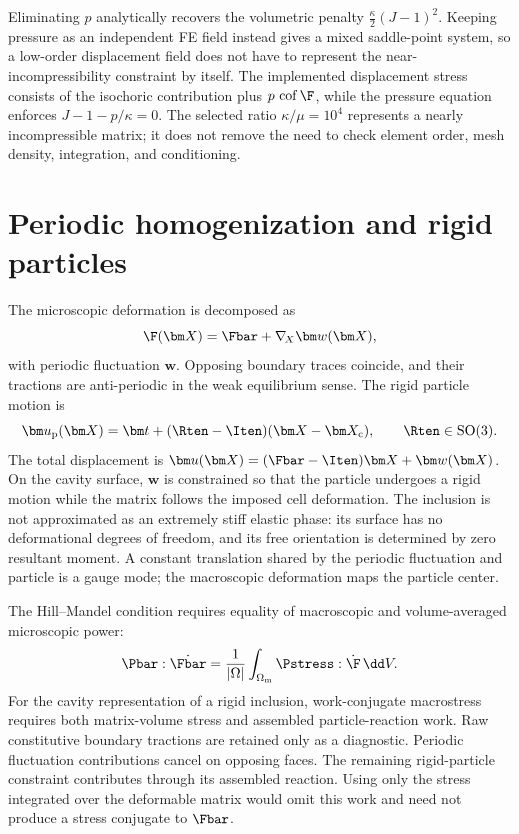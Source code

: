 Eliminating \(p\) analytically recovers the volumetric penalty
\(\frac{\kappa}{2}(J-1)^2\). Keeping pressure as an independent FE field
instead gives a mixed saddle-point system, so a low-order displacement field
does not have to represent the near-incompressibility constraint by itself.
The implemented displacement stress consists of the isochoric contribution
plus \(p\,\operatorname{cof}\F\), while the pressure equation enforces
\(J-1-p/\kappa=0\). The selected ratio \(\kappa/\mu=10^4\) represents a
nearly incompressible matrix; it does not remove the need to check element
order, mesh density, integration, and conditioning.

\section{Periodic homogenization and rigid particles}

The microscopic deformation is decomposed as
\begin{equation}
  \F(\bm X)=\Fbar+\nabla_{\!X}\bm w(\bm X),
\end{equation}
with periodic fluctuation \(\bm w\). Opposing boundary traces coincide, and
their tractions are anti-periodic in the weak equilibrium sense. The rigid
particle motion is
\begin{equation}
  \bm u_{\mathrm p}(\bm X)
  =
  \bm t+(\Rten-\Iten)(\bm X-\bm X_{\mathrm c}),
  \qquad
  \Rten\in\mathrm{SO}(3).
  \label{eq:rigid-motion}
\end{equation}
The total displacement is
\(\bm u(\bm X)=(\Fbar-\Iten)\bm X+\bm w(\bm X)\). On the cavity surface,
\(\bm w\) is constrained so that the particle undergoes a rigid motion while
the matrix follows the imposed cell deformation. The inclusion is not
approximated as an extremely stiff elastic phase: its surface has no
deformational degrees of freedom, and its free orientation is determined by
zero resultant moment. A constant translation shared by the periodic
fluctuation and particle is a gauge mode; the macroscopic deformation maps
the particle center.

The Hill--Mandel condition requires equality of macroscopic and volume-averaged
microscopic power:
\begin{equation}
  \Pbar:\dot{\Fbar}
  =
  \frac{1}{|\Omega|}
  \int_{\Omega_{\mathrm m}}
  \Pstress:\dot{\F}\,\dd V.
  \label{eq:hill-mandel}
\end{equation}
For the cavity representation of a rigid inclusion, work-conjugate
macrostress requires both matrix-volume stress and assembled particle-reaction
work. Raw constitutive boundary tractions are retained only as a diagnostic.
Periodic fluctuation contributions cancel on opposing faces. The remaining
rigid-particle constraint contributes through its assembled reaction. Using
only the stress integrated over the deformable matrix would omit this work
and need not produce a stress conjugate to \(\Fbar\).

